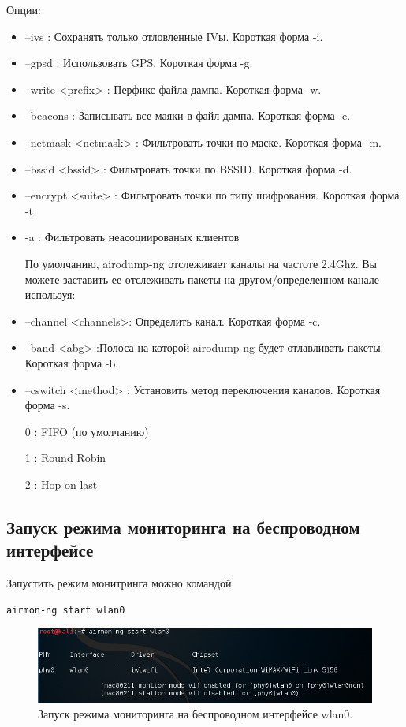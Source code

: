 \documentclass[10pt,a4paper]{article}
\begin{document}
Опции:
\begin{itemize}
\item --ivs : Сохранять только отловленные IVы. Короткая форма -i.
\item --gpsd : Использовать GPS. Короткая форма -g.
\item --write <prefix> : Перфикс файла дампа. Короткая форма -w.
\item --beacons : Записывать все маяки в файл дампа. Короткая форма -e.
\item --netmask <netmask> : Фильтровать точки по маске. Короткая форма -m.
\item --bssid <bssid> : Фильтровать точки по BSSID. Короткая форма -d.
\item --encrypt <suite> : Фильтровать точки по типу шифрования. Короткая форма -t
\item -a : Фильтровать неасоциированых клиентов

По умолчанию, airodump-ng отслеживает каналы на частоте 2.4Ghz.
Вы можете заставить ее отслеживать пакеты на другом/определенном канале используя:
\item --channel <channels>: Определить канал. Короткая форма -c.
\item --band <abg> :Полоса на которой airodump-ng будет отлавливать
пакеты. Короткая форма -b.
\item --cswitch <method> : Установить метод переключения каналов. Короткая форма -s.

0 : FIFO (по умолчанию)

1 : Round Robin

2 : Hop on last
\end{itemize}

\subsection{Запуск режима мониторинга на беспроводном интерфейсе}
Запустить режим монитринга можно командой
\begin{verbatim}
airmon-ng start wlan0
\end{verbatim}

\begin{figure}[h]
\centering
\includegraphics[width=\textwidth]{airmon_start}
\caption{Запуск режима мониторинга на беспроводном интерфейсе wlan0.}
\end{figure}
\end{document}
